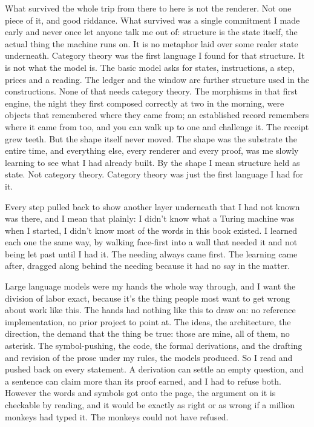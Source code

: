\documentclass[11pt,twoside]{article}
\theoremstyle{thielethm}
\theoremstyle{thieledef}
\theoremstyle{thieledef}
\theoremstyle{thieledef}
\theoremstyle{thielethm}
\theoremstyle{thieleobs}
\theoremstyle{thielethm}
\begin{document}
What survived the whole trip from there to here is not the renderer. Not one piece of it, and good riddance. What survived was a single commitment I made early and never once let anyone talk me out of: structure is the state itself, the actual thing the machine runs on. It is no metaphor laid over some realer state underneath. Category theory was the first language I found for that structure. It is not what the model is. The basic model asks for states, instructions, a step, prices and a reading. The ledger and the window are further structure used in the constructions. None of that needs category theory. The morphisms in that first engine, the night they first composed correctly at two in the morning, were objects that remembered where they came from; an established record remembers where it came from too, and you can walk up to one and challenge it. The receipt grew teeth. But the shape itself never moved. The shape was the substrate the entire time, and everything else, every renderer and every proof, was me slowly learning to see what I had already built. By the shape I mean structure held as state. Not category theory. Category theory was just the first language I had for it.

Every step pulled back to show another layer underneath that I had not known was there, and I mean that plainly: I didn't know what a Turing machine was when I started, I didn't know most of the words in this book existed. I learned each one the same way, by walking face-first into a wall that needed it and not being let past until I had it. The needing always came first. The learning came after, dragged along behind the needing because it had no say in the matter.

Large language models were my hands the whole way through, and I want the division of labor exact, because it's the thing people most want to get wrong about work like this. The hands had nothing like this to draw on: no reference implementation, no prior project to point at. The ideas, the architecture, the direction, the demand that the thing be true: those are mine, all of them, no asterisk. The symbol-pushing, the code, the formal derivations, and the drafting and revision of the prose under my rules, the models produced. So I read and pushed back on every statement. A derivation can settle an empty question, and a sentence can claim more than its proof earned, and I had to refuse both. However the words and symbols got onto the page, the argument on it is checkable by reading, and it would be exactly as right or as wrong if a million monkeys had typed it. The monkeys could not have refused.
\end{document}
